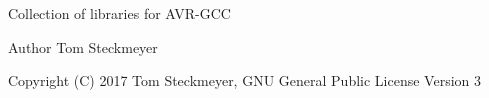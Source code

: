 Collection of libraries for A\+V\+R-\/\+G\+CC \begin{DoxyAuthor}{Author}
Tom Steckmeyer 
\end{DoxyAuthor}
\begin{DoxyCopyright}{Copyright}
(C) 2017 Tom Steckmeyer, G\+NU General Public License Version 3 
\end{DoxyCopyright}
